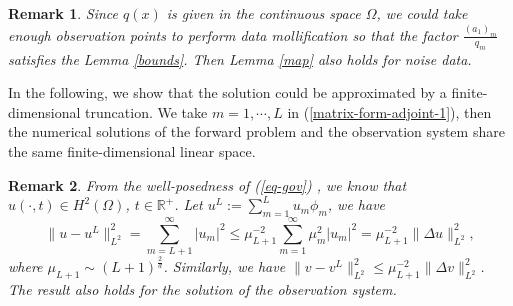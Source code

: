 \documentclass[11pt]{article}
\newtheorem{remark}{Remark}[section]
\numberwithin{equation}{section}
\begin{document}
\begin{remark}\label{bound-noise}
Since $q(x)$ is given in the continuous space $\Omega$, we could take enough observation points to perform data mollification so that the factor $\frac{(a_1)_m}{q_m}$ satisfies the Lemma \ref{bounds}. Then Lemma \ref{map} also holds for noise data. 
\end{remark}

In the following, we show that the solution could be approximated by a finite-dimensional truncation. We take $m=1,\cdots,L$ in (\ref{matrix-form-adjoint-1}), then the numerical solutions of the forward problem and the observation system share the same finite-dimensional linear space.
\begin{remark}\label{re-eq} From the well-posedness of (\ref{eq-gov}) \cite{LiZhang2025,LiZhang2024}, we know that $u(\cdot,t)\in H^2(\Omega)$, $t\in \mathbb{R}^+$.
Let $u^L:=\sum_{m=1}^{L}u_m\phi_m$, we have 
$$\|u-u^L\|_{L^2}^2=\sum_{m=L+1}^{\infty}|u_m|^2\leq \mu_{L+1}^{-2}\sum_{m=1}^{\infty}\mu_m^2|u_m|^2=\mu_{L+1}^{-2}\|\Delta u\|_{L^2}^2,$$
where $\mu_{L+1}\sim (L+1)^{\frac{2}{d}}$. 
Similarly, we have $\|v-v^L\|_{L^2}^2\leq \mu_{L+1}^{-2}\|\Delta v\|_{L^2}^2$.
The result also holds for the solution of the observation system.
\end{remark}
\end{document}
